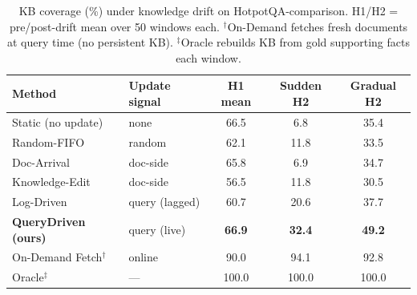 \begin{table}[t]
\centering
\caption{KB coverage (\%) under knowledge drift on HotpotQA-comparison.
H1/H2 = pre/post-drift mean over 50 windows each.
$^\dagger$On-Demand fetches fresh documents at query time (no persistent KB).
$^\ddagger$Oracle rebuilds KB from gold supporting facts each window.}
\label{tab:mo1_comparison}
\small
\begin{tabular}{llccc}
\toprule
\textbf{Method} & \textbf{Update signal} & \textbf{H1 mean} & \textbf{Sudden H2} & \textbf{Gradual H2} \\
\midrule
Static (no update) & none & 66.5 & 6.8 & 35.4 \\
Random-FIFO & random & 62.1 & 11.8 & 33.5 \\
Doc-Arrival & doc-side & 65.8 & 6.9 & 34.7 \\
Knowledge-Edit & doc-side & 56.5 & 11.8 & 30.5 \\
Log-Driven & query (lagged) & 60.7 & 20.6 & 37.7 \\
\textbf{QueryDriven (ours)} & query (live) & \textbf{66.9} & \textbf{32.4} & \textbf{49.2} \\
\midrule
On-Demand Fetch$^\dagger$ & online & 90.0 & 94.1 & 92.8 \\
\midrule
Oracle$^\ddagger$ & --- & 100.0 & 100.0 & 100.0 \\
\bottomrule
\end{tabular}
\end{table}
